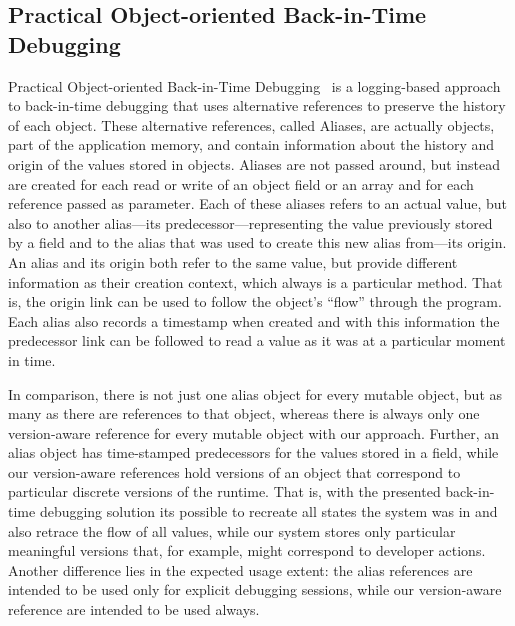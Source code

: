 \subsection{Practical Object-oriented Back-in-Time Debugging}

Practical Object-oriented Back-in-Time Debugging~\cite{Lienhard2008POB} is a logging-based approach to back-in-time debugging that uses alternative references to preserve the history of each object.
These alternative references, called Aliases, are actually objects, part of the application memory, and contain information about the history and origin of the values stored in objects.
Aliases are not passed around, but instead are created for each read or write of an object field or an array and for each reference passed as parameter.
Each of these aliases refers to an actual value, but also to another alias---its predecessor---representing the value previously stored by a field and to the alias that was used to create this new alias from---its origin.
An alias and its origin both refer to the same value, but provide different information as their creation context, which always is a particular method.
That is, the origin link can be used to follow the object's ``flow'' through the program.
Each alias also records a timestamp when created and with this information the predecessor link can be followed to read a value as it was at a particular moment in time.

In comparison, there is not just one alias object for every mutable object, but as many as there are references to that object, whereas there is always only one version-aware reference for every mutable object with our approach.
Further, an alias object has time-stamped predecessors for the values stored in a field, while our version-aware references hold versions of an object that correspond to particular discrete versions of the runtime.
That is, with the presented back-in-time debugging solution its possible to recreate all states the system was in and also retrace the flow of all values, while our system stores only particular meaningful versions that, for example, might correspond to developer actions.
Another difference lies in the expected usage extent: the alias references are intended to be used only for explicit debugging sessions, while our version-aware reference are intended to be used always.

